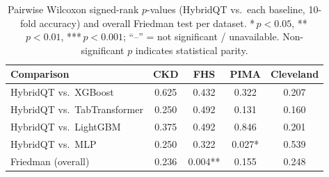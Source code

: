 \begin{table}[!ht]
\centering
\caption{Pairwise Wilcoxon signed-rank $p$-values (HybridQT vs.\ each baseline, 10-fold accuracy) and overall Friedman test per dataset. *\,$p<0.05$, **\,$p<0.01$, ***\,$p<0.001$; ``--'' = not significant / unavailable. Non-significant $p$ indicates statistical parity.}
\label{tab:significance}
\begin{tabular}{lcccc}
\toprule
Comparison & CKD & FHS & PIMA & Cleveland \\
\midrule
  HybridQT vs.\ XGBoost & 0.625 & 0.432 & 0.322 & 0.207 \\
  HybridQT vs.\ TabTransformer & 0.250 & 0.492 & 0.131 & 0.160 \\
  HybridQT vs.\ LightGBM & 0.375 & 0.492 & 0.846 & 0.201 \\
  HybridQT vs.\ MLP & 0.250 & 0.322 & 0.027* & 0.539 \\
\midrule
  Friedman (overall) & 0.236 & 0.004** & 0.155 & 0.248 \\
\bottomrule
\end{tabular}
\end{table}
